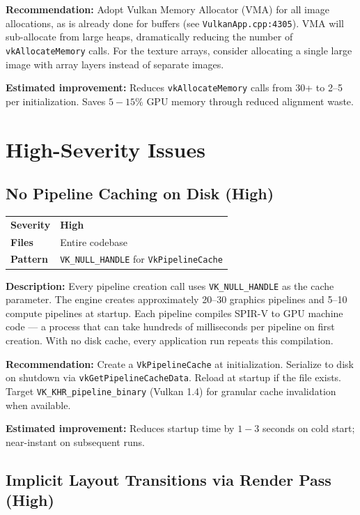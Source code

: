 \documentclass[a4paper,10pt]{article}
\newcommand{\severity}[1]{%
  \ifstrequal{#1}{Critical}{\textcolor{critical}{\textbf{#1}}}{%
  \ifstrequal{#1}{High}{\textcolor{high}{\textbf{#1}}}{%
  \ifstrequal{#1}{Medium}{\textcolor{medium}{\textbf{#1}}}{%
  \ifstrequal{#1}{Low}{\textcolor{low}{\textbf{#1}}}{#1}}}}}
\begin{document}
\noindent\textbf{Recommendation:} Adopt Vulkan Memory Allocator (VMA) for all
image allocations, as is already done for buffers (see
\texttt{VulkanApp.cpp:4305}). VMA will sub-allocate from large heaps,
dramatically reducing the number of \texttt{vkAllocateMemory} calls. For the
texture arrays, consider allocating a single large image with array layers
instead of separate images.

\noindent\textbf{Estimated improvement:} Reduces \texttt{vkAllocateMemory} calls
from 30+ to 2--5 per initialization. Saves $5{-}15\%$ GPU memory through
reduced alignment waste.

\section{High-Severity Issues}

\subsection{No Pipeline Caching on Disk (High)}

\begin{tabular}{ll}
\textbf{Severity} & \severity{High} \\
\textbf{Files}     & Entire codebase \\
\textbf{Pattern}   & \texttt{VK\_NULL\_HANDLE} for \texttt{VkPipelineCache} \\
\end{tabular}

\vspace{0.5em}
\noindent
\textbf{Description:} Every pipeline creation call uses
\texttt{VK\_NULL\_HANDLE} as the cache parameter. The engine creates
approximately 20--30 graphics pipelines and 5--10 compute pipelines at
startup. Each pipeline compiles SPIR-V to GPU machine code --- a process that
can take hundreds of milliseconds per pipeline on first creation. With no disk
cache, every application run repeats this compilation.

\noindent\textbf{Recommendation:} Create a \texttt{VkPipelineCache} at
initialization. Serialize to disk on shutdown via
\texttt{vkGetPipelineCacheData}. Reload at startup if the file exists. Target
\texttt{VK\_KHR\_pipeline\_binary} (Vulkan 1.4) for granular cache
invalidation when available.

\noindent\textbf{Estimated improvement:} Reduces startup time by
$1{-}3$ seconds on cold start; near-instant on subsequent runs.

\subsection{Implicit Layout Transitions via Render Pass (High)}
\end{document}
